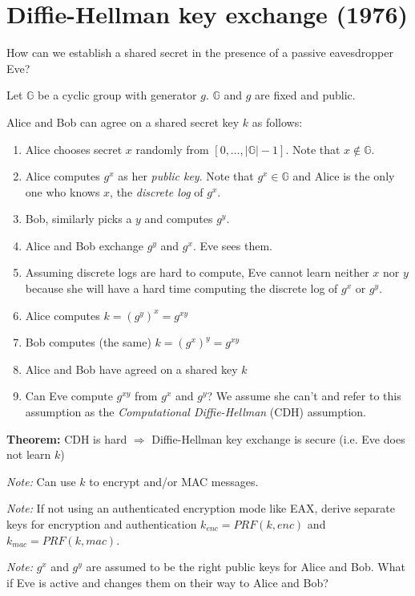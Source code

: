 \documentclass[11pt]{article}
\newcommand{\G}{\mathbb{G}}
\newcommand{\theorem}{\textbf{Theorem:} }
\newcommand{\note}{\emph{Note:} }
\begin{document}
\section{Diffie-Hellman key exchange (1976)}

How can we establish a shared secret in the presence of a passive eavesdropper
Eve?

Let $\G$ be a cyclic group with generator $g$. $\G$ and $g$ are fixed and public.

Alice and Bob can agree on a shared secret key $k$ as follows:

\begin{enumerate}
  \item Alice chooses secret $x$ randomly from $[0, \dots, |\G|-1]$. Note that
  $x \notin \G$.
  \item Alice computes $ g^x$ as her \emph{public key}. Note that $g^x \in \G$
  and Alice is the only one who knows $x$, the \emph{discrete log} of $g^x$.
  \item Bob, similarly picks a $y$ and computes $g^y$.
  \item Alice and Bob exchange $g^y$ and $g^x$. Eve sees them.
  \item Assuming discrete logs are hard to compute, Eve cannot learn neither $x$
  nor $y$ because she will have a hard time computing the discrete log of $g^x$ or
  $g^y$.
  \item Alice computes $k = (g^y)^x = g^{xy}$
  \item Bob computes (the same) $k = (g^x)^y = g^{xy}$
  \item Alice and Bob have agreed on a shared key $k$
  \item Can Eve compute $g^{xy}$ from $g^x$ and $g^y$? We assume she can't and
  refer to this assumption as the \emph{Computational Diffie-Hellman} (CDH)
  assumption.
\end{enumerate}

\theorem CDH is hard $\Rightarrow$ Diffie-Hellman key exchange is secure (i.e.
Eve does not learn $k$)

\note Can use $k$ to encrypt and/or MAC messages.

\note If not using an authenticated encryption mode like EAX, derive separate keys
for encryption and authentication $k_{enc} = PRF(k, enc)$ and $k_{mac} = PRF(k, mac)$.

\note $g^x$ and $g^y$ are assumed to be the right public keys for Alice and Bob.
What if Eve is active and changes them on their way to Alice and Bob?
\end{document}
